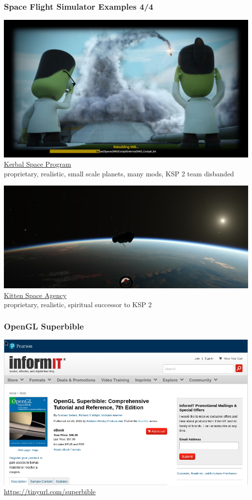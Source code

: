 \documentclass[aspectratio=169,11pt,xcolor=dvipsnames]{beamer}
\begin{document}
\begin{frame}
  \frametitle{Space Flight Simulator Examples 4/4}
  \begin{minipage}[t]{0.49\textwidth}
    \begin{center}
      \includegraphics[width=\textwidth]{ksp}\\
      \href{https://www.kerbalspaceprogram.com/}{Kerbal Space Program}\\
      proprietary, realistic, small scale planets, many mods, KSP 2 team disbanded
    \end{center}
  \end{minipage}
  \begin{minipage}[t]{0.49\textwidth}
    \begin{center}
      \includegraphics[width=\textwidth]{ksa}\\
      \href{https://rocketwerkz.com/}{Kitten Space Agency}\\
      proprietary, realistic, spiritual successor to KSP 2
    \end{center}
  \end{minipage}
\end{frame}

\begin{frame}
  \frametitle{OpenGL Superbible}
  \begin{center}
    \includegraphics[width=.35\textwidth]{superbible}\\
    \url{https://tinyurl.com/superbible}
  \end{center}
\end{frame}
\end{document}
